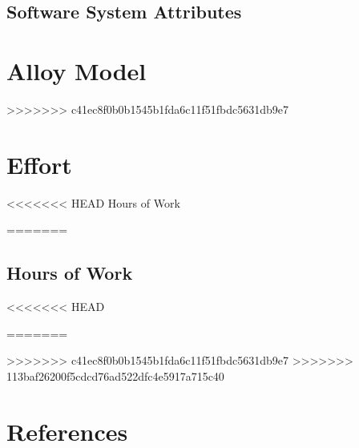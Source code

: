 \documentclass[12pt, a4paper]{report}
\begin{document}
\section{Software System Attributes}


\chapter{Alloy Model}
\label{ch:alloy}



>>>>>>> c41ec8f0b0b1545b1fda6c11f51fbdc5631db9e7
\chapter{Effort}
\label{ch:effort}

<<<<<<< HEAD
Hours of Work

=======
\section{Hours of Work}
<<<<<<< HEAD

=======

>>>>>>> c41ec8f0b0b1545b1fda6c11f51fbdc5631db9e7
>>>>>>> 113baf26200f5cdcd76ad522dfc4e5917a715c40

\chapter{References}



%

%
\end{document}
